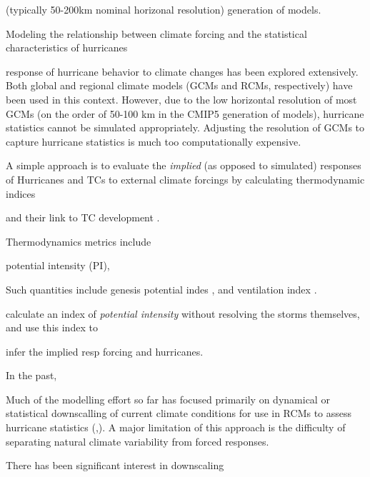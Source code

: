 (typically
50-200km nominal horizonal resolution) generation of models.


Modeling the relationship between climate forcing and the statistical
characteristics of hurricanes 

response of hurricane behavior to climate changes has
been explored extensively. Both global and regional climate models
(GCMs and RCMs, respectively) have been used in this context. However,
due to the low horizontal resolution of most GCMs (on the order of
50-100 km in the CMIP5 generation of models), hurricane statistics
cannot be simulated appropriately. Adjusting the resolution of GCMs to
capture hurricane statistics is much too computationally expensive.



A simple approach is to evaluate the
\textit{implied} (as opposed to simulated) responses of Hurricanes and
TCs to external climate forcings by calculating thermodynamic indices



and their link
to TC development \cite{wang}.

Thermodynamics metrics include

potential intensity (PI),

Such quantities include genesis potential indes
\cite{ke_nolan}, and ventilation index \cite{tang}.


calculate an index of
\textit{potential intensity} without resolving the storms themselves,
and use this index to

infer the implied resp
forcing and hurricanes.



In
the past,


Much of the
modelling effort so far has focused primarily on dynamical or
statistical downscalling of current climate conditions for use in RCMs
to assess hurricane statistics
(\cite{kerry_clivar},\cite{down_method_ke}). A major limitation of
this approach is the difficulty of separating natural climate
variability from forced responses.


There has been significant interest in downscaling

